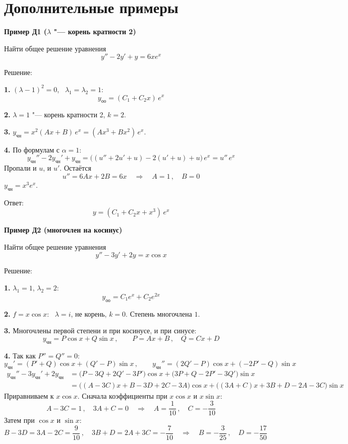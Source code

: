 \documentclass[11pt,a4paper]{article}
\newcommand{\example}[1]{\par\medskip\noindent\textbf{#1}\par\nopagebreak\smallskip}
\newcommand{\yoo}{y_{\text{оо}}}
\newcommand{\ych}{y_{\text{чн}}}
\begin{document}
\section*{Дополнительные примеры}

\example{Пример Д1 ($\lambda$ "--- корень кратности 2)}

Найти общее решение уравнения
\[
  y'' - 2y' + y = 6x e^{x}
\]

Решение:

\textbf{1.} $(\lambda - 1)^2 = 0$, \ $\lambda_1 = \lambda_2 = 1$:
\[
  \yoo = (C_1 + C_2 x)\, e^{x}
\]

\textbf{2.} $\lambda = 1$ "--- корень кратности 2, $k = 2$.

\textbf{3.} $\ych = x^2(Ax + B)\, e^{x} = (Ax^3 + Bx^2)\, e^{x}$.

\textbf{4.} По формулам с $\alpha = 1$:
\[
  \ych'' - 2\ych' + \ych = \bigl((u'' + 2u' + u) - 2(u' + u) + u\bigr)\, e^{x} = u''\, e^{x}
\]
Пропали и $u$, и $u'$. Остаётся
\[
  u'' = 6Ax + 2B = 6x
  \quad\Rightarrow\quad
  A = 1\,, \quad B = 0
\]
$\ych = x^3 e^{x}$.

Ответ:
\[
  y = (C_1 + C_2 x + x^3)\, e^{x}
\]

\example{Пример Д2 (многочлен на косинус)}

Найти общее решение уравнения
\[
  y'' - 3y' + 2y = x\cos x
\]

Решение:

\textbf{1.} $\lambda_1 = 1$, $\lambda_2 = 2$:
\[
  \yoo = C_1 e^{x} + C_2 e^{2x}
\]

\textbf{2.} $f = x\cos x$: \ $\lambda = i$, не корень, $k = 0$. Степень многочлена $1$.

\textbf{3.} Многочлены первой степени и при косинусе, и при синусе:
\[
  \ych = P\cos x + Q\sin x\,, \qquad P = Ax + B\,, \quad Q = Cx + D
\]

\textbf{4.} Так как $P'' = Q'' = 0$:
\[
  \ych' = (P' + Q)\cos x + (Q' - P)\sin x\,, \qquad
  \ych'' = (2Q' - P)\cos x + (-2P' - Q)\sin x
\]
\[
\begin{aligned}
  \ych'' - 3\ych' + 2\ych
  &= \bigl(P - 3Q + 2Q' - 3P'\bigr)\cos x + \bigl(3P + Q - 2P' - 3Q'\bigr)\sin x\\
  &= \bigl((A - 3C)x + B - 3D + 2C - 3A\bigr)\cos x + \bigl((3A + C)x + 3B + D - 2A - 3C\bigr)\sin x
\end{aligned}
\]
Приравниваем к $x\cos x$. Сначала коэффициенты при $x\cos x$ и $x\sin x$:
\[
  A - 3C = 1\,, \quad 3A + C = 0
  \quad\Rightarrow\quad
  A = \frac{1}{10}\,, \quad C = -\frac{3}{10}
\]
Затем при $\cos x$ и $\sin x$:
\[
  B - 3D = 3A - 2C = \frac{9}{10}\,, \quad 3B + D = 2A + 3C = -\frac{7}{10}
  \quad\Rightarrow\quad
  B = -\frac{3}{25}\,, \quad D = -\frac{17}{50}
\]
\end{document}
